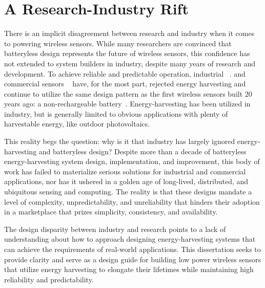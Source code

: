 \section{A Research-Industry Rift}
There is an implicit disagreement between research and industry when it comes to powering wireless sensors. 
While many researchers are convinced that batteryless design represents the future of wireless sensors, this confidence has not extended to system builders in industry, despite many years of research and development. 
To achieve reliable and predictable operation, 
industrial
~\cite{emersonRosemount,GEInsightMesh,honeywellOneWireless}.
and commercial sensors 
~\cite{ecobeeSensor, honeywellThermostat, lutronSolutions, googleNestTemperature, hueSensor} 
have, for the most part, rejected energy harvesting and continue to utilize the same design pattern as the first wireless sensors built 20 years ago: a non-rechargeable battery~\cite{polastre2005telos, hill2002wireless}. 
Energy-harvesting has been utilized in industry, but is generally limited to obvious applications with plenty of harvestable energy, like outdoor photovoltaics. 

This reality begs the question: why is it that industry has largely ignored energy-harvesting and batteryless design? 
Despite more than a decade of batteryless energy-harvesting system design, implementation, and improvement, this body of work has failed to materialize serious solutions for industrial and commercial applications, nor has it ushered in a golden age of long-lived, distributed, and ubiquitous sensing and computing.
The reality is that these designs mandate a level of complexity, unpredictability, and unreliability that hinders their adoption in a marketplace that prizes simplicity, consistency, and availability.

The design disparity between industry and research 
points to a lack of understanding about how to approach designing energy-harvesting systems that can achieve the requirements of real-world applications. This dissertation seeks to provide clarity and serve as a design guide for building low power wireless sensors that utilize energy harvesting to elongate their lifetimes while maintaining high reliability and predictability.


